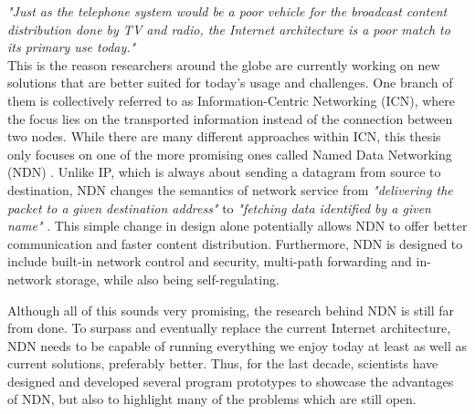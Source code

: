 \textit{ "Just as the telephone system would be a poor vehicle for the broadcast content distribution done by TV and radio, the Internet architecture is a poor match to its primary use today."} \\



This is the reason researchers around the globe are currently working on new solutions that are better suited for today's usage and challenges. One branch of them is collectively referred to as Information-Centric Networking (ICN), where the focus lies on the transported information instead of the connection between two nodes. While there are many different approaches within ICN, this thesis only focuses on one of the more promising ones called Named Data Networking (NDN) \cite{ZEBJ10}. Unlike IP, which is always about sending a datagram from source to destination, NDN changes the semantics of network service from \textit{"delivering the packet to a given destination address"} to \textit{"fetching data identified by a given name"} \cite{ZABJ14}. This simple change in design alone potentially allows NDN to offer better communication and faster content distribution. Furthermore, NDN is designed to include built-in network control and security, multi-path forwarding and in-network storage, while also being self-regulating. \cite{ZEBJ10, ZABJ14}

Although all of this sounds very promising, the research behind NDN is still far from done. To surpass and eventually replace the current Internet architecture, NDN needs to be capable of running everything we enjoy today at least as well as current solutions, preferably better. Thus, for the last decade, scientists have designed and developed several program prototypes to showcase the advantages of NDN, but also to highlight many of the problems which are still open. 


